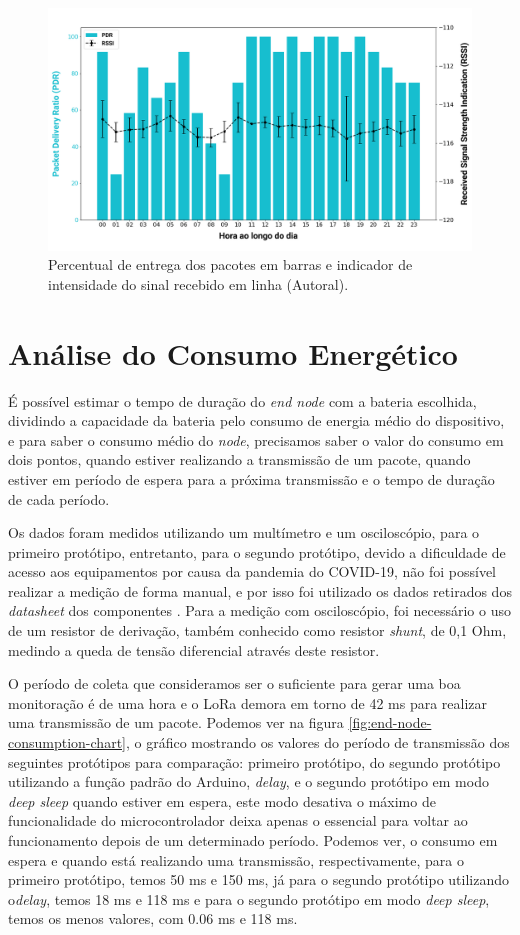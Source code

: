 \begin{figure}[H]
  \centering
  \includegraphics[width=.80\textwidth]{assets/21-04-2020-pdr-rssi.png} 
  \caption{Percentual de entrega dos pacotes em barras e indicador de intensidade do sinal recebido em linha (Autoral).}
  \label{fig:21-04-2020-pdr-rssi} 
\end{figure}

\section{Análise do Consumo Energético}
\label{result:consumo}
É possível estimar o tempo de duração do \textit{end node} com a bateria escolhida, dividindo a capacidade da bateria pelo consumo de energia médio do dispositivo, e para saber o consumo médio do \textit{node}, precisamos saber o valor do consumo em dois pontos, quando estiver realizando a transmissão de um pacote,  quando estiver em período de espera para a próxima transmissão e o tempo de duração de cada período.

Os dados foram medidos utilizando um multímetro e um osciloscópio, para o primeiro protótipo, entretanto, para o segundo protótipo, devido a dificuldade de acesso aos equipamentos por causa da pandemia do COVID-19, não foi possível realizar a medição de forma manual, e por isso foi utilizado os dados retirados dos \textit{datasheet} dos componentes . Para a medição com osciloscópio, foi necessário o uso de um resistor de derivação, também conhecido como resistor \textit{shunt}, de 0,1 Ohm, medindo a queda de tensão diferencial através deste resistor.

O período de coleta que consideramos ser o suficiente para gerar uma boa monitoração é de uma hora e o LoRa demora em torno de 42 ms para realizar uma transmissão de um pacote. Podemos ver na figura \ref{fig:end-node-consumption-chart}, o gráfico mostrando os valores do período de transmissão dos seguintes protótipos para comparação: primeiro protótipo, do segundo protótipo utilizando a função padrão do Arduino, \textit{delay}, e o segundo protótipo em modo \textit{deep sleep} quando estiver em espera, este modo desativa o máximo de funcionalidade do microcontrolador deixa apenas o essencial para voltar ao funcionamento depois de um determinado período. Podemos ver, o consumo em espera e quando está realizando uma transmissão, respectivamente, para o primeiro protótipo, temos 50 ms e 150 ms, já para o segundo protótipo utilizando o\textit{delay}, temos 18 ms e 118 ms e para o segundo protótipo em modo  \textit{deep sleep}, temos os menos valores, com 0.06 ms e 118 ms.

